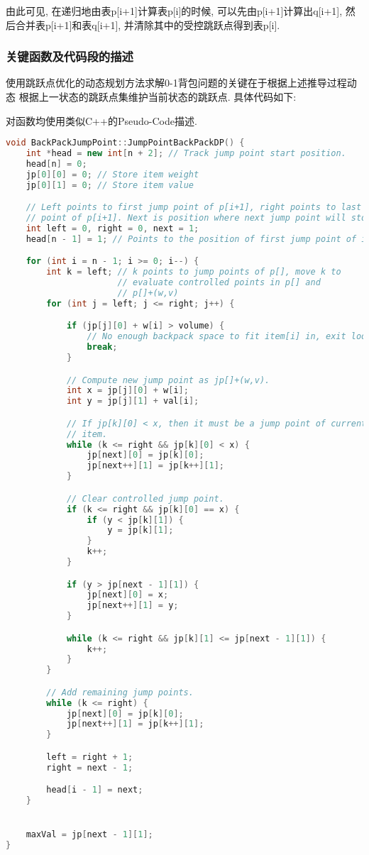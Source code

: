 由此可见, 在递归地由表p[i+1]计算表p[i]的时候, 可以先由p[i+1]计算出q[i+1],
然后合并表p[i+1]和表q[i+1], 并清除其中的受控跳跃点得到表p[i].

\subsubsection{关键函数及代码段的描述}
使用跳跃点优化的动态规划方法求解0-1背包问题的关键在于根据上述推导过程动态
根据上一状态的跳跃点集维护当前状态的跳跃点. 具体代码如下:\par
对函数均使用类似C++的Pseudo-Code描述.

\begin{lstlisting}[language=c++]
void BackPackJumpPoint::JumpPointBackPackDP() {
    int *head = new int[n + 2]; // Track jump point start position.
    head[n] = 0;
    jp[0][0] = 0; // Store item weight
    jp[0][1] = 0; // Store item value

    // Left points to first jump point of p[i+1], right points to last jump
    // point of p[i+1]. Next is position where next jump point will store.
    int left = 0, right = 0, next = 1;
    head[n - 1] = 1; // Points to the position of first jump point of item[n-1].

    for (int i = n - 1; i >= 0; i--) {
        int k = left; // k points to jump points of p[], move k to
                      // evaluate controlled points in p[] and
                      // p[]+(w,v)
        for (int j = left; j <= right; j++) {

            if (jp[j][0] + w[i] > volume) {
                // No enough backpack space to fit item[i] in, exit loop.
                break;
            }

            // Compute new jump point as jp[]+(w,v).
            int x = jp[j][0] + w[i];
            int y = jp[j][1] + val[i];

            // If jp[k][0] < x, then it must be a jump point of current
            // item.
            while (k <= right && jp[k][0] < x) {
                jp[next][0] = jp[k][0];
                jp[next++][1] = jp[k++][1];
            }

            // Clear controlled jump point.
            if (k <= right && jp[k][0] == x) {
                if (y < jp[k][1]) {
                    y = jp[k][1];
                }
                k++;
            }

            if (y > jp[next - 1][1]) {
                jp[next][0] = x;
                jp[next++][1] = y;
            }

            while (k <= right && jp[k][1] <= jp[next - 1][1]) {
                k++;
            }
        }

        // Add remaining jump points.
        while (k <= right) {
            jp[next][0] = jp[k][0];
            jp[next++][1] = jp[k++][1];
        }

        left = right + 1;
        right = next - 1;

        head[i - 1] = next;
    }


    maxVal = jp[next - 1][1];
}
\end{lstlisting}

